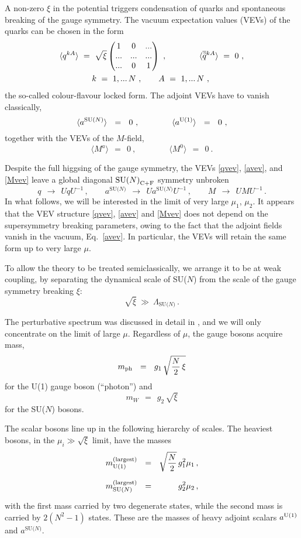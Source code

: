 \documentclass[12pt]{article}
\def\beq{\begin{equation}}
\def\eeq{\end{equation}}
\newcommand{\wt}{\widetilde}
\newcommand{\ov}{\overline}
\newcommand{\LN}{\Lambda_\text{SU($N$)}}
\def\cfl {$\text{SU($N$)}_{\rm C+F}$ }
\newcommand{\aU}{a^{\rm U(1)}}
\newcommand{\aN}{a^\text{SU($N$)}}
\begin{document}
	A non-zero $ \xi $ in the potential triggers condensation of quarks and spontaneous breaking 
	of the gauge symmetry. 
	The vacuum expectation values (VEVs) of the quarks can be chosen in the form
\begin{align}
%
\notag
&
	\langle q^{kA} \rangle ~=~ \sqrt{\xi} 
		\begin{pmatrix}
			 1  &   0  &  ... \\
			... &  ... &  ... \\
			... &   0  &  1 
		\end{pmatrix} ~,
	\qquad\qquad 
	\langle \ov{\wt{q}}{}^{kA} \rangle ~=~ 0~,
	\\
%
\label{qvev}
&
	\qquad\qquad  k~=~ 1,...\, N~, \qquad  A ~=~ 1,...\, N~,
\end{align}
	the so-called colour-flavour locked form.
	The adjoint VEVs have to vanish classically,
\beq
\label{avev}
	\langle \aN \rangle  ~~=~~ 0~, \qquad\qquad  \langle \aU \rangle ~~=~~ 0~,
\eeq
	together with the VEVs of the $ M $-field,
\beq
\label{Mvev}
	\langle M^a \rangle ~~=~~ 0~, \qquad\qquad  \langle M^0 \rangle ~~=~~ 0~.
\eeq

	Despite the full higgsing of the gauge symmetry, the VEVs \eqref{qvev},
	\eqref{avev}, and \eqref{Mvev} leave a global diagonal \cfl symmetry unbroken
\beq
\label{c+f}
	q ~~\to~~ UqU^{-1}\,, \qquad \aN ~~\to~~ U \aN U^{-1}\,, \qquad
		M ~~\to~~ UMU^{-1}\,.
\eeq
	In what follows, we will be interested in the limit of very large $ \mu_1 $, $ \mu_2 $.
	It appears that the VEV structure \eqref{qvev}, \eqref{avev} and \eqref{Mvev} does not
	depend on the supersymmetry breaking parameters, owing to the fact that 
	the adjoint fields vanish in the vacuum, Eq.~\eqref{avev}.
	In particular, the VEVs will retain the same form up to very large $ \mu $. 

	To allow the theory to be treated semiclassically, we arrange it to be at weak
	coupling, by separating the dynamical scale of SU($N$) from the scale of the gauge
	symmetry breaking $ \xi $:
\[
 \sqrt{\xi} ~\gg~ \LN \,.
\]

	The perturbative spectrum was discussed in detail in \cite{GSYmmodel}, and we will only
	concentrate on the limit of large $ \mu $. 
	Regardless of $ \mu $, the gauge bosons acquire mass,
\beq
\label{phmass}
	m_{\rm ph} ~~=~~ g_1\, \sqrt{\frac{N}{2}\,\xi}
\eeq
	for the U(1) gauge boson (``photon'') and
\beq
\label{wmass}
	m_W ~~=~~ g_2\, \sqrt{\xi}
\eeq
	for the SU($N$) bosons.

	The scalar bosons line up in the following hierarchy of scales.
	The heaviest bosons, in the $ \mu_i \gg \sqrt{\xi} $ limit, have the masses
\begin{align}
\label{amass}
%
\notag
	m_{\rm U(1)}^{\rm(largest)} & ~~=~~ \sqrt{\frac{N}{2}}\, g_1^2\mu_1 \,, \\
%
	m_\text{SU($N$)}^{\rm(largest)} & ~~=~~ \phantom{\sqrt{\frac{N}{2}}\, }
						g_2^2\mu_2\,,
\end{align}
	with the first mass carried by two degenerate states, while
	the second mass is carried by $ 2 (N^2 - 1) $ states.
	These are the masses of heavy adjoint scalars $ \aU $ and $ \aN $.
\end{document}
